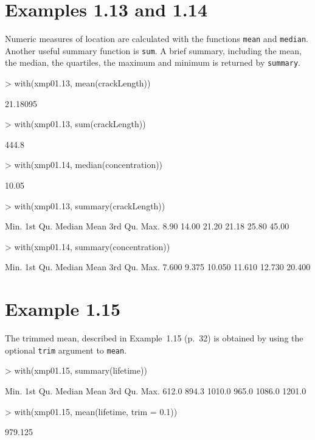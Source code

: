 \documentclass{book}
\begin{document}
\section{Examples 1.13 and 1.14}
\label{sec:xmp01.13}

Numeric measures of location are calculated with the functions
\texttt{mean} and \texttt{median}.  Another useful summary function is
\texttt{sum}.  A brief summary, including the mean, the median, the
quartiles, the maximum and minimum is returned by \texttt{summary}.
\begin{Schunk}
\begin{Sinput}
> with(xmp01.13, mean(crackLength))
\end{Sinput}
\begin{Soutput}
[1] 21.18095
\end{Soutput}
\begin{Sinput}
> with(xmp01.13, sum(crackLength))
\end{Sinput}
\begin{Soutput}
[1] 444.8
\end{Soutput}
\begin{Sinput}
> with(xmp01.14, median(concentration))
\end{Sinput}
\begin{Soutput}
[1] 10.05
\end{Soutput}
\begin{Sinput}
> with(xmp01.13, summary(crackLength))
\end{Sinput}
\begin{Soutput}
   Min. 1st Qu.  Median    Mean 3rd Qu.    Max. 
   8.90   14.00   21.20   21.18   25.80   45.00 
\end{Soutput}
\begin{Sinput}
> with(xmp01.14, summary(concentration))
\end{Sinput}
\begin{Soutput}
   Min. 1st Qu.  Median    Mean 3rd Qu.    Max. 
  7.600   9.375  10.050  11.610  12.730  20.400 
\end{Soutput}
\end{Schunk}

\section{Example 1.15}
\label{sec:xmp01.15}

The trimmed mean, described in Example~1.15 (p.~32) is obtained by using
the optional \texttt{trim} argument to \texttt{mean}.
\begin{Schunk}
\begin{Sinput}
> with(xmp01.15, summary(lifetime))
\end{Sinput}
\begin{Soutput}
   Min. 1st Qu.  Median    Mean 3rd Qu.    Max. 
  612.0   894.3  1010.0   965.0  1086.0  1201.0 
\end{Soutput}
\begin{Sinput}
> with(xmp01.15, mean(lifetime, trim = 0.1))
\end{Sinput}
\begin{Soutput}
[1] 979.125
\end{Soutput}
\end{Schunk}
\end{document}
